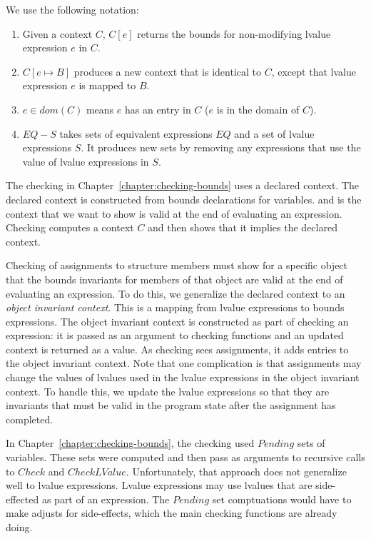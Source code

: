 We use the following notation:
\begin{enumerate}
\item Given a context $C$, $C[e]$ returns the bounds for non-modifying lvalue expression $e$ in $C$.
\item $C[e \mapsto B]$ produces a new context that is identical to $C$,
except that lvalue expression  $e$ is mapped to $B$.
\item $e \in dom(C)$ means $e$ has an entry in $C$ ($e$ is in the domain of $C$).
\item $EQ - S$ takes sets of equivalent expressions $EQ$  and a set of lvalue expressions
$S$.  It produces new sets by removing any expressions that use the value 
of lvalue expressions in $S$.
\end{enumerate}

The checking in Chapter~\ref{chapter:checking-bounds} uses a declared context.
The declared context is constructed from bounds declarations for variables.  
and is the context that we want to show is valid at the end of evaluating an expression.
Checking computes a context $C$ and then shows that it implies the declared context. 

Checking of assignments to structure members must show for a specific
object that the bounds invariants for members of that object are valid at the 
end of evaluating an expression.  To do this, we generalize the declared
context to an {\em object invariant context}. This is a mapping from lvalue
expressions to bounds expressions.  The object invariant context is constructed
as part of checking an expression: it is passed as an argument to checking functions
and an updated context is returned as a value.  As checking sees assignments, 
it adds entries to the object invariant context.  Note that one complication is
that assignments may change the values of lvalues used in the lvalue expressions in the
object invariant context.  To handle this, we update the lvalue expressions so that
they are invariants that must be valid in the program state after the assignment has 
completed.

In Chapter~\ref{chapter:checking-bounds}, the checking used $Pending$ sets of 
variables.   These sets were computed and then pass as arguments to recursive
calls to $Check$ and $CheckLValue$.  Unfortunately, that approach does not generalize
well to lvalue expressions.  Lvalue expressions may use lvalues that are side-effected
as part of an expression.  The $Pending$ set comptuations would have to make
adjusts for side-effects, which the main checking functions are already doing.

